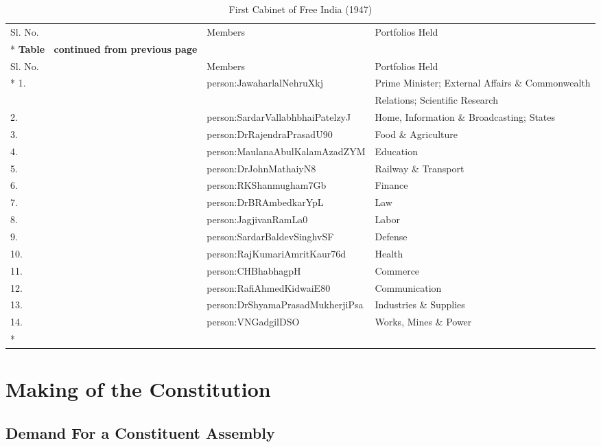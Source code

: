 \begin{longtable}[c]{@{}|l|l|l|@{}}
	\caption{First Cabinet of Free India (1947)}
	\label{tbl:firstCabinetOfFreeIndia}\\
	\toprule
	Sl. No. & Members & Portfolios Held \\* \midrule
	\endfirsthead
	\multicolumn{3}{c}%
	{{\bfseries Table \thetable\ continued from previous page}} \\
	\toprule
	Sl. No. & Members & Portfolios Held \\* \midrule
	\endhead
	\bottomrule
	\endfoot
	\endlastfoot
	1. & \gls{person:JawaharlalNehruXkj} & Prime Minister; External Affairs \& Commonwealth \\
	&                           & Relations; Scientific Research \\
	2. & \gls{person:SardarVallabhbhaiPatelzyJ} & Home, Information \& Broadcasting; States \\
	3. & \gls{person:DrRajendraPrasadU90} & Food \& Agriculture \\
	4. & \gls{person:MaulanaAbulKalamAzadZYM} & Education \\
	5. & \gls{person:DrJohnMathaiyN8} & Railway \& Transport \\
	6. & \gls{person:RKShanmugham7Gb} & Finance \\
	7. & \gls{person:DrBRAmbedkarYpL} & Law \\
	8. & \gls{person:JagjivanRamLa0} & Labor \\
	9. & \gls{person:SardarBaldevSinghvSF} & Defense \\
	10. & \gls{person:RajKumariAmritKaur76d} & Health \\
	11. & \gls{person:CHBhabhagpH} & Commerce \\
	12. & \gls{person:RafiAhmedKidwaiE80} & Communication \\
	13. & \gls{person:DrShyamaPrasadMukherjiPsa} & Industries \& Supplies \\
	14. & \gls{person:VNGadgilDSO} & Works, Mines \& Power \\* \bottomrule
\end{longtable}

\twocolumn
\cleardoublepage

\chapter{Making of the Constitution}

\section{Demand For a Constituent Assembly}

